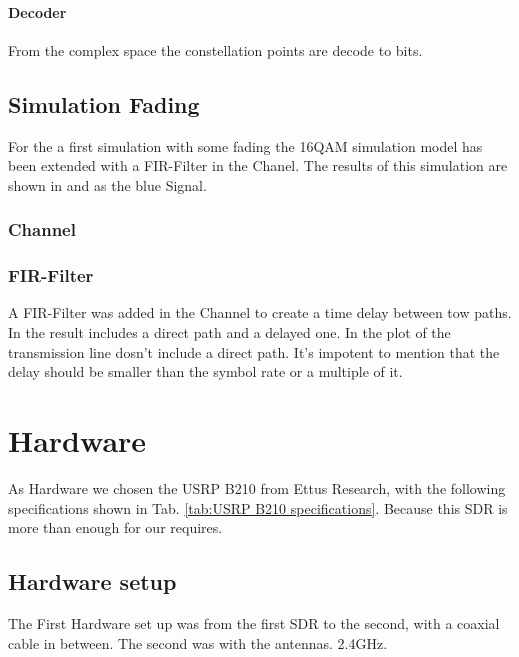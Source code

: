 \paragraph{Decoder}

From the complex space the constellation points are decode to bits.



\subsection{Simulation Fading}
For the a first simulation with some fading the 16QAM simulation model has been extended with a FIR-Filter in the Chanel. The results of this simulation are shown in  and  as the blue Signal.

\subsubsection{Channel}
\subsubsection{FIR-Filter}
A FIR-Filter was added in the Channel to create a time delay between tow paths. In  the result includes a direct path and a delayed one. In the plot of  the transmission line dosn't include a direct path. It's impotent to mention that the delay should be smaller than the symbol rate or a multiple of it. 


\section{Hardware}

As Hardware we chosen the USRP B210 from Ettus Research, with the following specifications shown in Tab. \ref{tab:USRP B210 specifications}. Because this SDR is more than enough for our requires.

\subsection{Hardware setup}

The First Hardware set up was from the first SDR to the second, with a coaxial cable in between. 
The second was with the antennas. 2.4GHz. 




